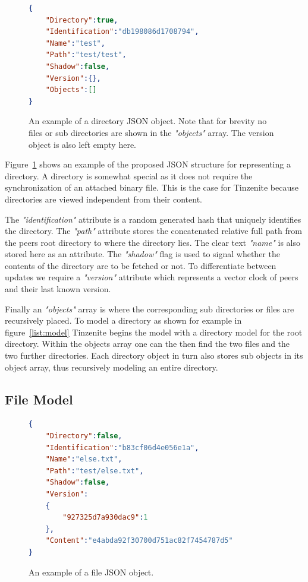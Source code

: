 \begin{figure}[htp]
    \begin{lstlisting}[language=json,firstnumber=0]
{
    "Directory":true,
    "Identification":"db198086d1708794",
    "Name":"test",
    "Path":"test/test",
    "Shadow":false,
    "Version":{},
    "Objects":[]
}
    \end{lstlisting}
\caption[Directory JSON Model]{An example of a directory JSON object. Note that for brevity no files or sub directories are shown in the \textit{"objects"} array. The version object is also left empty here.}
\label{json:directory_model}
\end{figure}

Figure~\ref{json:directory_model} shows an example of the proposed JSON structure for representing a directory.
A directory is somewhat special as it does not require the synchronization of an attached binary file.
This is the case for Tinzenite because directories are viewed independent from their content.

The \textit{"identification"} attribute is a random generated hash that uniquely identifies the directory.
The \textit{"path"} attribute stores the concatenated relative full path from the peers root directory to where the directory lies.
The clear text \textit{"name"} is also stored here as an attribute.
The \textit{"shadow"} flag is used to signal whether the contents of the directory are to be fetched or not.
To differentiate between updates we require a \textit{"version"} attribute which represents a vector clock of peers and their last known version.

Finally an \textit{"objects"} array is where the corresponding sub directories or files are recursively placed.
To model a directory as shown for example in figure~\ref{list:model} Tinzenite begins the model with a directory model for the root directory.
Within the objects array one can the then find the two files and the two further directories.
Each directory object in turn also stores sub objects in its object array, thus recursively modeling an entire directory.

\subsection{File Model}
\label{sec:file_model}

\begin{figure}[htp]
    \begin{lstlisting}[language=json,firstnumber=0]
{
    "Directory":false,
    "Identification":"b83cf06d4e056e1a",
    "Name":"else.txt",
    "Path":"test/else.txt",
    "Shadow":false,
    "Version":
    {
        "927325d7a930dac9":1
    },
    "Content":"e4abda92f30700d751ac82f7454787d5"
}
    \end{lstlisting}
\caption[File JSON Model]{An example of a file JSON object.}
\label{json:file_model}
\end{figure}

